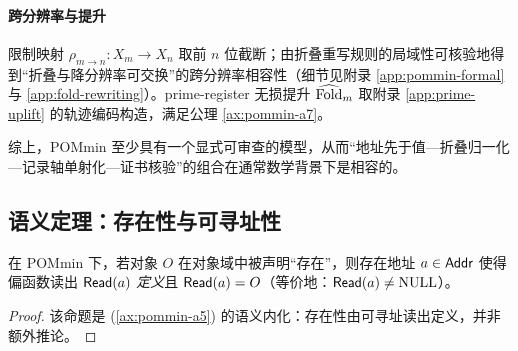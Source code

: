 \paragraph{跨分辨率与提升}
限制映射 $\rho_{m\to n}:X_m\to X_n$ 取前 $n$ 位截断；由折叠重写规则的局域性可核验地得到“折叠与降分辨率可交换”的跨分辨率相容性（细节见附录 \ref{app:pommin-formal} 与 \ref{app:fold-rewriting}）。prime-register 无损提升 $\widehat{\mathrm{Fold}}_m$ 取附录 \ref{app:prime-uplift} 的轨迹编码构造，满足公理 \ref{ax:pommin-a7}。\par

综上，POMmin 至少具有一个显式可审查的模型，从而“地址先于值—折叠归一化—记录轴单射化—证书核验”的组合在通常数学背景下是相容的。

\subsection{语义定理：存在性与可寻址性}
\begin{proposition}[存在性语义]\label{prop:existence-semantics}
在 POMmin 下，若对象 $O$ 在对象域中被声明“存在”，则存在地址 $a\in\mathsf{Addr}$ 使得偏函数读出 $\mathsf{Read}(a)$ \emph{定义}且 $\mathsf{Read}(a)=O$（等价地：$\mathsf{Read}(a)\neq \mathrm{NULL}$）。
\end{proposition}

\begin{proof}
该命题是 (\ref{ax:pommin-a5}) 的语义内化：存在性由可寻址读出定义，并非额外推论。
\end{proof}

